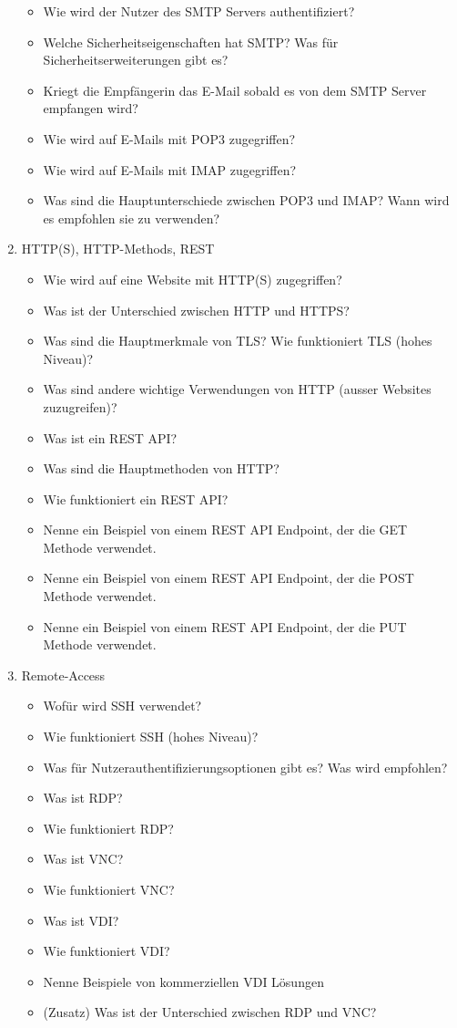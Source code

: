 \begin{enumerate}
\begin{itemize}
        \item Wie wird der Nutzer des SMTP Servers authentifiziert?
        \item Welche Sicherheitseigenschaften hat SMTP? Was für Sicherheitserweiterungen gibt es?
        \item Kriegt die Empfängerin das E-Mail sobald es von dem SMTP Server empfangen wird?
        \item Wie wird auf E-Mails mit POP3 zugegriffen?
        \item Wie wird auf E-Mails mit IMAP zugegriffen?
        \item Was sind die Hauptunterschiede zwischen POP3 und IMAP? Wann wird es empfohlen sie zu verwenden?
    \end{itemize}
    \item HTTP(S), HTTP-Methods, REST
    \begin{itemize}
        \item Wie wird auf eine Website mit HTTP(S) zugegriffen?
        \item Was ist der Unterschied zwischen HTTP und HTTPS?
        \item Was sind die Hauptmerkmale von TLS? Wie funktioniert TLS (hohes Niveau)?
        \item Was sind andere wichtige Verwendungen von HTTP (ausser Websites zuzugreifen)?
        \item Was ist ein REST API?
        \item Was sind die Hauptmethoden von HTTP?
        \item Wie funktioniert ein REST API?
        \item Nenne ein Beispiel von einem REST API Endpoint, der die GET Methode verwendet.
        \item Nenne ein Beispiel von einem REST API Endpoint, der die POST Methode verwendet.
        \item Nenne ein Beispiel von einem REST API Endpoint, der die PUT Methode verwendet.
    \end{itemize}
    \item Remote-Access
    \begin{itemize}
        \item Wofür wird SSH verwendet?
        \item Wie funktioniert SSH (hohes Niveau)?
        \item Was für Nutzerauthentifizierungsoptionen gibt es? Was wird empfohlen?
        \item Was ist RDP?
        \item Wie funktioniert RDP?
        \item Was ist VNC?
        \item Wie funktioniert VNC?
        \item Was ist VDI?
        \item Wie funktioniert VDI?
        \item Nenne Beispiele von kommerziellen VDI Lösungen
        \item (Zusatz) Was ist der Unterschied zwischen RDP und VNC?
    \end{itemize}
\end{enumerate}

